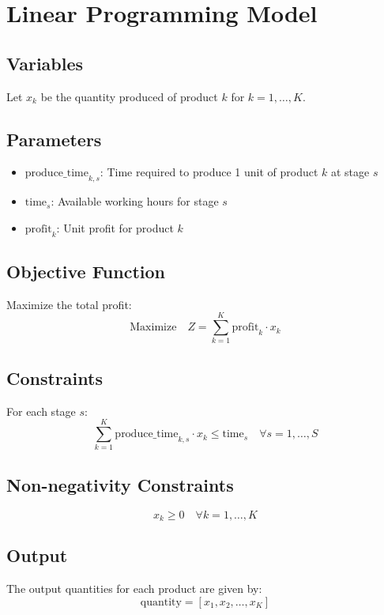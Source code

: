 \documentclass{article}
\begin{document}
\section*{Linear Programming Model}

\subsection*{Variables}
Let \( x_k \) be the quantity produced of product \( k \) for \( k = 1, \ldots, K \).

\subsection*{Parameters}
\begin{itemize}
    \item \( \text{produce\_time}_{k,s} \): Time required to produce 1 unit of product \( k \) at stage \( s \)
    \item \( \text{time}_s \): Available working hours for stage \( s \)
    \item \( \text{profit}_k \): Unit profit for product \( k \)
\end{itemize}

\subsection*{Objective Function}
Maximize the total profit:
\[
\text{Maximize} \quad Z = \sum_{k=1}^{K} \text{profit}_k \cdot x_k
\]

\subsection*{Constraints}
For each stage \( s \):
\[
\sum_{k=1}^{K} \text{produce\_time}_{k,s} \cdot x_k \leq \text{time}_s \quad \forall s = 1, \ldots, S
\]

\subsection*{Non-negativity Constraints}
\[
x_k \geq 0 \quad \forall k = 1, \ldots, K
\]

\subsection*{Output}
The output quantities for each product are given by:
\[
\text{quantity} = [x_1, x_2, \ldots, x_K]
\]
\end{document}
